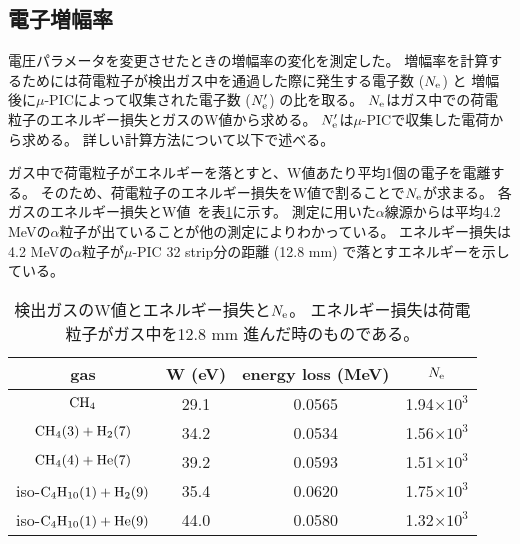 \documentclass[../master]{subfiles}
\begin{document}
\subsection{電子増幅率}
電圧パラメータを変更させたときの増幅率の変化を測定した。
増幅率を計算するためには荷電粒子が検出ガス中を通過した際に発生する電子数 ($N_{\rm e}$) と
増幅後に$\mu$-PICによって収集された電子数 ($N'_{\rm e}$) の比を取る。
$N_{\rm e}$はガス中での荷電粒子のエネルギー損失とガスのW値から求める。
$N'_{\rm e}$は$\mu$-PICで収集した電荷から求める。
詳しい計算方法について以下で述べる。

ガス中で荷電粒子がエネルギーを落とすと、W値あたり平均1個の電子を電離する。
そのため、荷電粒子のエネルギー損失をW値で割ることで$N_{\rm e}$が求まる。
各ガスのエネルギー損失とW値~\cite{energy_per_ion_pair,pdg}を表\ref{tab::energy_loss_and_W_val}に示す。
測定に用いた$\alpha$線源からは平均4.2 MeVの$\alpha$粒子が出ていることが他の測定によりわかっている。
エネルギー損失は4.2 MeVの$\alpha$粒子が$\mu$-PIC 32 strip分の距離 (12.8 mm) で落とすエネルギーを示している。
\begin{table}
  \centering
  \caption[検出ガスのW値とエネルギー損失と$N_{\rm e}$。]
          {検出ガスのW値とエネルギー損失と$N_{\rm e}$。
          エネルギー損失は荷電粒子がガス中を12.8 mm 進んだ時のものである。}
  \label{tab::energy_loss_and_W_val}
  \begin{tabular}{cccc}
    \toprule
    gas & W (eV) & energy loss (MeV) & $N_{\rm e}$\\
    \midrule
    ${\rm CH_{4}}$                          & 29.1 & 0.0565 & 1.94$\times 10^{3}$ \\
    ${\rm CH_{4} (3) + H_{2} (7)}$          & 34.2 & 0.0534 & 1.56$\times 10^{3}$ \\
    ${\rm CH_{4} (4) + He (7)}$             & 39.2 & 0.0593 & 1.51$\times 10^{3}$ \\
    iso-${\rm C_{4}H_{10} (1) + H_{2} (9)}$ & 35.4 & 0.0620 & 1.75$\times 10^{3}$ \\
    iso-${\rm C_{4}H_{10} (1) + He (9)}$    & 44.0 & 0.0580 & 1.32$\times 10^{3}$ \\
    \bottomrule
  \end{tabular}
\end{table}
\end{document}
